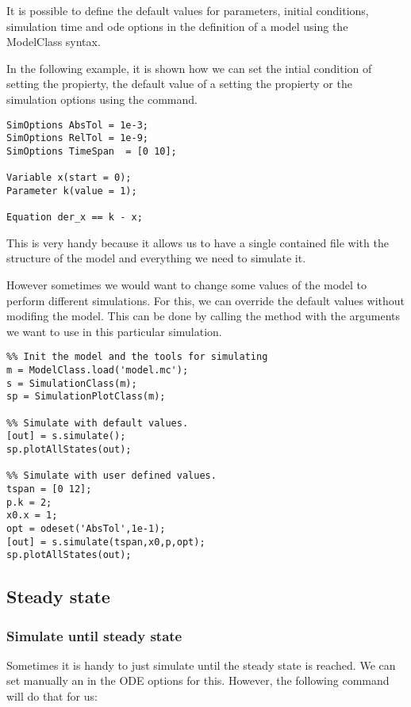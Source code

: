 \documentclass[11pt]{article}
\begin{document}
It is possible to define the default values for parameters, initial conditions, simulation time and ode options in the definition of a model using the ModelClass syntax.

In the following example, it is shown how we can set the intial condition of  setting the  propierty, the default value of a  setting the  propierty or the simulation options using the  command.

\begin{lstlisting}
SimOptions AbsTol = 1e-3;
SimOptions RelTol = 1e-9;
SimOptions TimeSpan  = [0 10];

Variable x(start = 0);
Parameter k(value = 1);

Equation der_x == k - x;
\end{lstlisting}

This is very handy because it allows us to have a single contained file with the structure of the model and everything we need to simulate it.

However sometimes we would want to change some values of the model to perform different simulations.
For this, we can override the default values without modifing the model. This can be done by calling the  method with the arguments we want to use in this particular simulation.

\begin{lstlisting}
%% Init the model and the tools for simulating
m = ModelClass.load('model.mc');
s = SimulationClass(m);
sp = SimulationPlotClass(m);

%% Simulate with default values.
[out] = s.simulate();
sp.plotAllStates(out);

%% Simulate with user defined values.
tspan = [0 12];
p.k = 2;
x0.x = 1;
opt = odeset('AbsTol',1e-1);
[out] = s.simulate(tspan,x0,p,opt);
sp.plotAllStates(out);
\end{lstlisting}

\subsection{Steady state}

\subsubsection{Simulate until steady state}

Sometimes it is handy to just simulate until the steady state is reached. We can set manually an  in the ODE options for this. However, the following command will do that for us:
\end{document}
